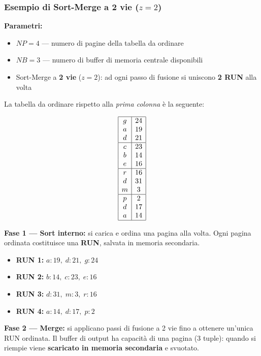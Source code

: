 \subsubsection{Esempio di Sort-Merge a 2 vie ($z = 2$)}

\textbf{Parametri:}
\begin{itemize}
	\item $NP = 4$ — numero di pagine della tabella da ordinare
	\item $NB = 3$ — numero di buffer di memoria centrale disponibili
	\item Sort-Merge a \textbf{2 vie} ($z = 2$): ad ogni passo di fusione si uniscono \textbf{2 RUN} alla volta
\end{itemize}

\bigskip
\noindent La tabella da ordinare rispetto alla \textit{prima colonna} è la seguente:

\[
\begin{array}{|c|c|}
	\hline
	g & 24 \\
	a & 19 \\
	d & 21 \\
	\hline
	c & 23 \\
	b & 14 \\
	e & 16 \\
	\hline
	r & 16 \\
	d & 31 \\
	m & 3  \\
	\hline
	p & 2  \\
	d & 17 \\
	a & 14 \\
	\hline
\end{array}
\]

\bigskip
\noindent\textbf{Fase 1 — Sort interno:} si carica e ordina una pagina alla volta. Ogni pagina ordinata costituisce una \textbf{RUN}, salvata in memoria secondaria.

\begin{itemize}
	\item \textbf{RUN 1:} $a:19,\; d:21,\; g:24$
	\item \textbf{RUN 2:} $b:14,\; c:23,\; e:16$
	\item \textbf{RUN 3:} $d:31,\; m:3,\; r:16$
	\item \textbf{RUN 4:} $a:14,\; d:17,\; p:2$
\end{itemize}

\bigskip
\noindent\textbf{Fase 2 — Merge:} si applicano passi di fusione a 2 vie fino a ottenere un'unica RUN ordinata. Il buffer di output ha capacità di una pagina (3 tuple): quando si riempie viene \textbf{scaricato in memoria secondaria} e svuotato.

